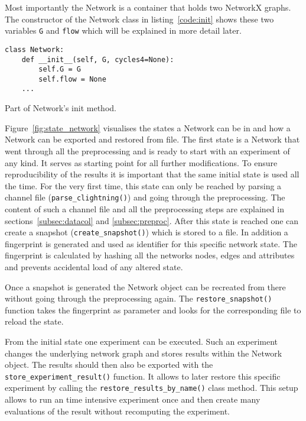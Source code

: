 \documentclass[final]{fhnwreport}       %
\begin{document}
Most importantly the Network is a container that holds two NetworkX graphs. The constructor of the Network class in listing~\ref{code:init} shows these two variables \texttt{G} and \texttt{flow} which will be explained in more detail later.

\begin{listing}[H]
  \begin{verbatim}
class Network:
    def __init__(self, G, cycles4=None):
        self.G = G
        self.flow = None
	...
  \end{verbatim}
  \caption{Part of Network's init method.}
  \label{code:init}
\end{listing}

Figure~\ref{fig:state_network} visualises the states a Network can be in and how a Network can be exported and restored from file. The first state is a Network that went through all the preprocessing and is ready to start with an experiment of any kind. It serves as starting point for all further modifications. To ensure reproducibility of the results it is important that the same initial state is used all the time. For the very first time, this state can only be reached by parsing a channel file (\texttt{parse_clightning()}) and going through the preprocessing. The content of such a channel file and all the preprocessing steps are explained in sections~\ref{subsec:datacol} and \ref{subsec:preproc}. After this state is reached one can create a snapshot (\texttt{create_snapshot()}) which is stored to a file. In addition a fingerprint is generated and used as identifier for this specific network state. The fingerprint is calculated by hashing all the networks nodes, edges and attributes and prevents accidental load of any altered state.

Once a snapshot is generated the Network object can be recreated from there without going through the preprocessing again. The \texttt{restore_snapshot()} function takes the fingerprint as parameter and looks for the corresponding file to reload the state. 

From the initial state one experiment can be executed. Such an experiment changes the underlying network graph and stores results within the Network object. The results should then also be exported with the \texttt{store_experiment_result()} function. It allows to later restore this specific experiment by calling the \texttt{restore_results_by_name()} class method. This setup allows to run an time intensive experiment once and then create many evaluations of the result without recomputing the experiment. 
\end{document}
